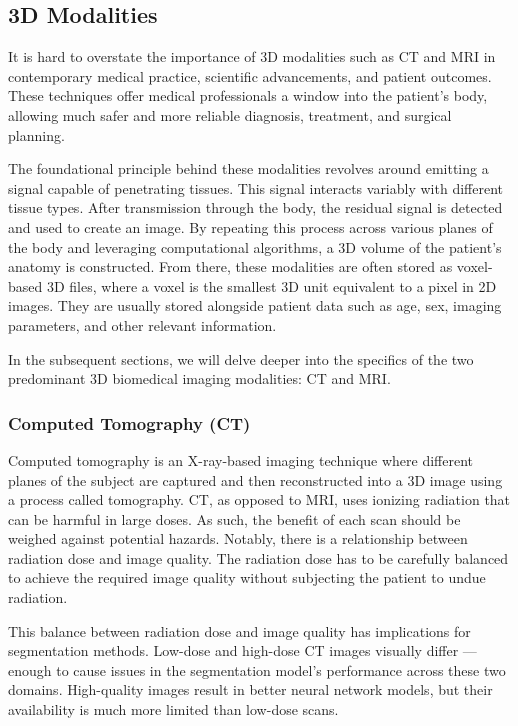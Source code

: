 \subsection{3D Modalities}

It is hard to overstate the importance of 3D modalities such as CT and MRI in contemporary medical practice, scientific advancements, and patient outcomes. These techniques offer medical professionals a window into the patient's body, allowing much safer and more reliable diagnosis, treatment, and surgical planning. 

The foundational principle behind these modalities revolves around emitting a signal capable of penetrating tissues. This signal interacts variably with different tissue types. After transmission through the body, the residual signal is detected and used to create an image. By repeating this process across various planes of the body and leveraging computational algorithms, a 3D volume of the patient's anatomy is constructed. From there, these modalities are often stored as voxel-based 3D files, where a voxel is the smallest 3D unit equivalent to a pixel in 2D images. They are usually stored alongside patient data such as age, sex, imaging parameters, and other relevant information.

In the subsequent sections, we will delve deeper into the specifics of the two predominant 3D biomedical imaging modalities: CT and MRI.

\subsubsection{Computed Tomography (CT)}

Computed tomography is an X-ray-based imaging technique where different planes of the subject are captured and then reconstructed into a 3D image using a process called tomography. CT, as opposed to MRI, uses ionizing radiation that can be harmful in large doses. As such, the benefit of each scan should be weighed against potential hazards. Notably, there is a relationship between radiation dose and image quality. The radiation dose has to be carefully balanced to achieve the required image quality without subjecting the patient to undue radiation.

This balance between radiation dose and image quality has implications for segmentation methods. Low-dose and high-dose CT images visually differ --- enough to cause issues in the segmentation model's performance across these two domains. High-quality images result in better neural network models, but their availability is much more limited than low-dose scans.

